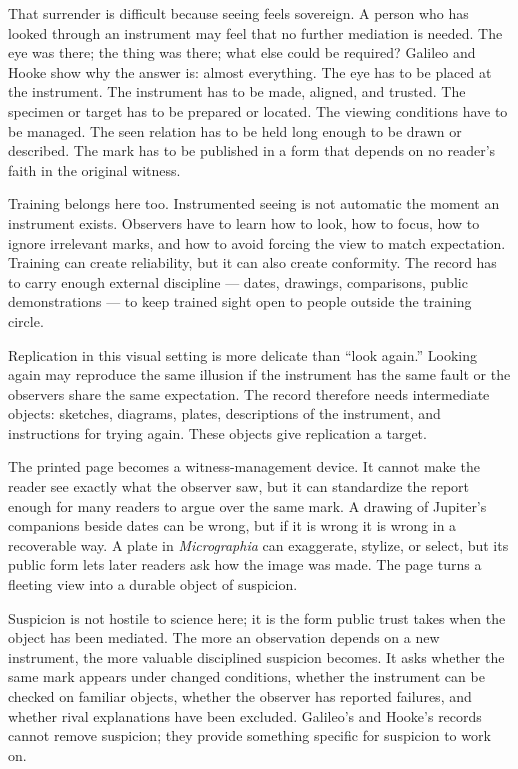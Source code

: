 That surrender is difficult because seeing feels sovereign. A person who
has looked through an instrument may feel that no further mediation is
needed. The eye was there; the thing was there; what else could be
required? Galileo and Hooke show why the answer is: almost everything.
The eye has to be placed at the instrument. The instrument has to be
made, aligned, and trusted. The specimen or target has to be prepared or
located. The viewing conditions have to be managed. The seen relation
has to be held long enough to be drawn or described. The mark has to be
published in a form that depends on no reader's faith in the original
witness.

Training belongs here too. Instrumented seeing is not automatic the
moment an instrument exists. Observers have to learn how to look, how to
focus, how to ignore irrelevant marks, and how to avoid forcing the view
to match expectation. Training can create reliability, but it can also
create conformity. The record has to carry enough external discipline ---
dates, drawings, comparisons, public demonstrations --- to keep trained
sight open to people outside the training circle.

Replication in this visual setting is more delicate than ``look again.''
Looking again may reproduce the same illusion if the instrument has the
same fault or the observers share the same expectation. The record
therefore needs intermediate objects: sketches, diagrams, plates,
descriptions of the instrument, and instructions for trying again. These
objects give replication a target.

The printed page becomes a witness-management device. It cannot make the
reader see exactly what the observer saw, but it can standardize the
report enough for many readers to argue over the same mark. A drawing of
Jupiter's companions beside dates can be wrong, but if it is wrong it is
wrong in a recoverable way. A plate in \emph{Micrographia} can
exaggerate, stylize, or select, but its public form lets later readers
ask how the image was made. The page turns a fleeting view into a
durable object of suspicion.

Suspicion is not hostile to science here; it is the form public trust
takes when the object has been mediated. The more an observation depends
on a new instrument, the more valuable disciplined suspicion becomes. It
asks whether the same mark appears under changed conditions, whether the
instrument can be checked on familiar objects, whether the observer has
reported failures, and whether rival explanations have been excluded.
Galileo's and Hooke's records cannot remove suspicion; they provide
something specific for suspicion to work on.

